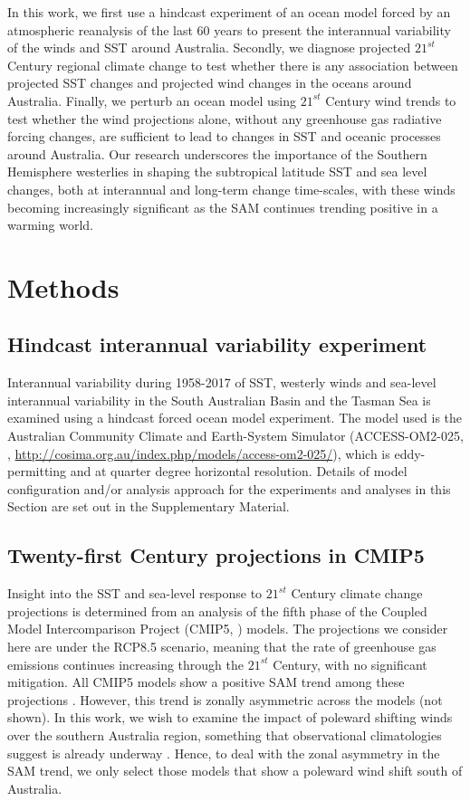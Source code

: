 \documentclass[draft,linenumbers]{agujournal2018}
\begin{document}
In this work, we first use a hindcast experiment of an ocean model forced by an atmospheric reanalysis of the last 60 years to present the interannual variability of the winds and SST around Australia. Secondly, we diagnose projected $21^{st}$ Century regional climate change to test whether there is any association between projected SST changes and projected wind changes in the oceans around Australia. Finally, we perturb an ocean model using $21^{st}$ Century wind trends to test whether the wind projections alone, without any greenhouse gas radiative forcing changes, are sufficient to lead to changes in SST and oceanic processes around Australia. Our research underscores the importance of the Southern Hemisphere westerlies in shaping the subtropical latitude SST and sea level changes, both at interannual and long-term change time-scales, with these winds becoming increasingly significant as the SAM continues trending positive in a warming world.



\section{Methods}
\subsection{Hindcast interannual variability experiment}
Interannual variability during 1958-2017 of SST, westerly winds and sea-level interannual variability in the South Australian Basin and the Tasman Sea is examined using a hindcast forced ocean model experiment. The model used is the Australian Community Climate and Earth-System Simulator (ACCESS-OM2-025, \citealp{Bi2012}, \url{http://cosima.org.au/index.php/models/access-om2-025/}), which is eddy-permitting and at quarter degree horizontal resolution. Details of model configuration and/or analysis approach for the experiments and analyses in this Section are set out in the Supplementary Material.

\subsection{Twenty-first Century projections in CMIP5} \label{Twenty-first Century analysis in CMIP5}
Insight into the SST and sea-level response to $21^{st}$ Century climate change projections is determined from an analysis of the fifth phase of the Coupled Model Intercomparison Project (CMIP5, \citealp{Taylor2012}) models. The projections we consider here are under the RCP8.5 scenario, meaning that the rate of greenhouse gas emissions continues increasing through the $21^{st}$ Century, with no significant mitigation. All CMIP5 models show a positive SAM trend among these projections \citep{Bracegirdle2013}. However, this trend is zonally asymmetric across the models (not shown). In this work, we wish to examine the impact of poleward shifting winds over the southern Australia region, something that observational climatologies suggest is already underway \citep{Reichler2016}. Hence, to deal with the zonal asymmetry in the SAM trend, we only select those models that show a poleward wind shift south of Australia.
\end{document}
